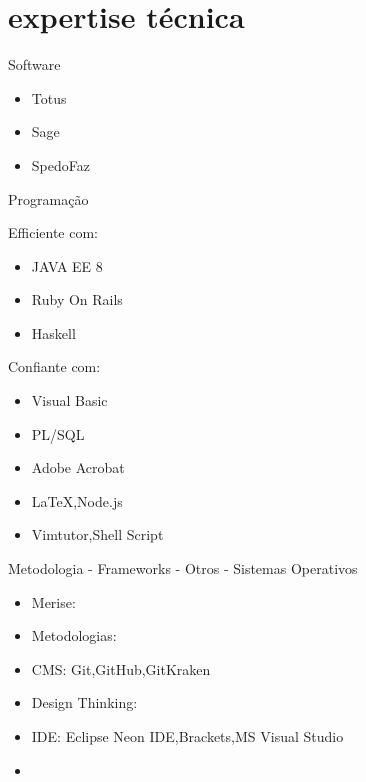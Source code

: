 \documentclass[a4paper]{myfriggeri-cv}
\begin{document}
\section{expertise técnica}
\begin{entrylist}
\entry
{}
{Software}
{}
{}
{
\begin{itemize}
\item{} Totus
\item{} Sage
\item{} SpedoFaz
\end{itemize}
}
\entry
{}
{Programação}
{}
{}
{
Efficiente com:
\begin{itemize}
\item{} JAVA EE 8
\item{} Ruby On Rails
\item{} Haskell
\end{itemize}
Confiante com:
\begin{itemize}
\item{} Visual Basic
\item{} PL/SQL
\item{} Adobe Acrobat
\item{} \LaTeX,Node.js
\item{} Vimtutor,Shell Script
\end{itemize}
}
\entry
{}
{Metodologia - Frameworks - Otros - Sistemas Operativos}
{}
{}
{
\begin{itemize}
\item{} Merise: \textbf{}
\item{} Metodologias:\textbf{}
\item{} CMS: Git,GitHub,GitKraken
\item{} Design Thinking: \textbf{}
\item{} IDE: Eclipse Neon IDE,Brackets,MS Visual Studio
\item{} \textbf{}
\end{itemize}
}
\end{entrylist}
\end{document}
